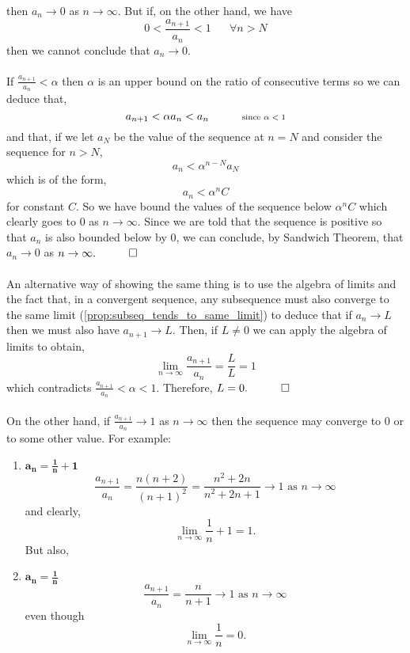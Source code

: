 \documentclass[../MathsNotesBase.tex]{subfiles}
\begin{document}
\begin{exe}
{{{						then ${ a_n \to 0 }$ as ${ n \to \infty }$. But if, on the other hand, we have
						\[ 0 < \frac{a_{n+1}}{a_n} < 1 \hspace{20pt} \forall n > N \]
						then we cannot conclude that ${ a_n \to 0 }$.
				 }}\\\\
				If ${ \frac{a_{n+1}}{a_n} < \alpha }$ then $\alpha$ is an upper bound on the ratio of consecutive terms so we can deduce that,
				\[ a_{n+1} < \alpha a_n < a_n \hspace{30pt} \text{\scriptsize{since ${ \alpha < 1 }$}} \]
				and that, if we let ${ a_N }$ be the value of the sequence at ${ n = N }$ and consider the sequence for ${ n > N }$,
				\[ a_n < \alpha^{n - N}a_N \]
				which is of the form,
				\[ a_n < \alpha^n C \]
				for constant $C$. So we have bound the values of the sequence below ${ \alpha^n C }$ which clearly goes to 0 as ${ n \to \infty }$. Since we are told that the sequence is positive so that $a_n$ is also bounded below by 0, we can conclude, by Sandwich Theorem, that ${ a_n \to 0 }$ as ${ n \to \infty. \hspace{10pt}\qed}$\\\\
				An alternative way of showing the same thing is to use the algebra of limits and the fact that, in a convergent sequence, any subsequence must also converge to the same limit (\autoref{prop:subseq_tends_to_same_limit}) to deduce that if ${ a_n \to L }$ then we must also have ${ a_{n+1} \to L }$. Then, if ${ L \neq 0 }$ we can apply the algebra of limits to obtain,
				\[ \lim_{n \to \infty} \frac{a_{n+1}}{a_n} = \frac{L}{L} = 1 \]
				which contradicts ${ \frac{a_{n+1}}{a_n} < \alpha < 1 }$. Therefore, ${ L = 0.  \hspace{10pt}\qed}$\\\\
				On the other hand, if ${ \frac{a_{n+1}}{a_n} \to 1 }$ as ${ n \to \infty }$ then the sequence may converge to 0 or to some other value. For example:
				\begin{enumerate}[label=(\roman*)]
					\item{${\bm{ a_n = \frac{1}{n} + 1 }}$}
					\[ \frac{a_{n+1}}{a_n} = \frac{n(n+2)}{(n+1)^2} =\frac{n^2 + 2n}{n^2 + 2n + 1} \to 1 \text{ as } n \to \infty \]
					and clearly,
					\[ \lim_{n \to \infty} \frac{1}{n} + 1 = 1. \]
					But also,
					\item{${\bm{ a_n = \frac{1}{n} }}$}
					\[  \frac{a_{n+1}}{a_n} = \frac{n}{n+1} \to 1 \text{ as } n \to \infty \]
					even though
					\[ \lim_{n \to \infty} \frac{1}{n} = 0. \]
				\end{enumerate}
		}
		\end{exe}
\end{document}
